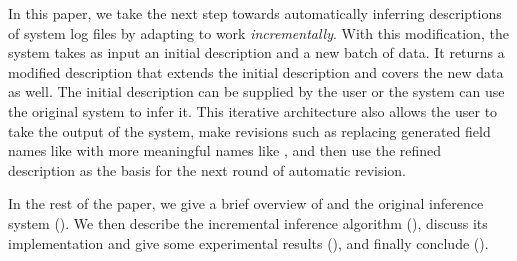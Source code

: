 In this paper, we take the next step towards automatically inferring
descriptions of system log files by adapting \learnpads{} to work
\textit{incrementally}.  With this modification, the system takes as input
an initial description and a new batch of data. It returns a modified
description that extends the initial description and covers the new
data as well. The initial description
can be supplied by the user or the system can use the original
\learnpads{} system to infer it.  This iterative architecture also
allows the user to take the output of the system, make revisions such
as replacing generated field names like  with more meaningful
names like , and then use the refined description as the
basis for the next round of automatic revision.

In the rest of the paper, we give a brief overview of \pads{} and the
original inference system ().  We then describe
the incremental inference algorithm (), discuss its
implementation and give some experimental results (),
and finally conclude ().

%
%
%
